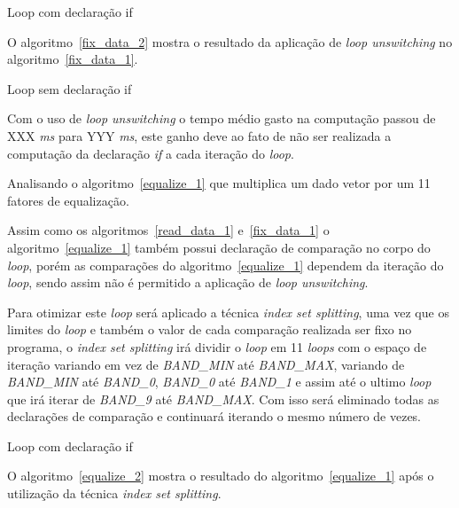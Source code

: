 \begin{algorithm}
    \caption{Loop com declaração if }
    \label{fix_data_1}

\end{algorithm}

O algoritmo~\ref{fix_data_2} mostra o resultado da aplicação de \textit{loop
unswitching} no algoritmo~\ref{fix_data_1}.

\begin{algorithm}
    \caption{Loop sem declaração if }
    \label{fix_data_2}

\end{algorithm}

Com o uso de \textit{loop unswitching} o tempo médio gasto na computação passou
de XXX \textit{ms} para YYY \textit{ms}, este ganho deve ao fato de não ser
realizada a computação da declaração \textit{if} a cada iteração do
\textit{loop}.


Analisando o algoritmo~\ref{equalize_1} que multiplica um dado vetor por um
11 fatores de equalização.

Assim como os algoritmos~\ref{read_data_1} e~\ref{fix_data_1} o
algoritmo~\ref{equalize_1} também possui declaração de comparação no corpo do
\textit{loop}, porém as comparações do algoritmo~\ref{equalize_1} dependem da
iteração do \textit{loop}, sendo assim não é permitido a aplicação de
\textit{loop unswitching}.

Para otimizar este \textit{loop} será aplicado a técnica \textit{index set
splitting}, uma vez que os limites do \textit{loop} e também o valor de cada
comparação realizada ser fixo no programa, o \textit{index set splitting} irá
dividir o \textit{loop} em 11 \textit{loops} com o espaço de iteração variando
em vez de \textit{BAND\_MIN} até \textit{BAND\_MAX}, variando de
\textit{BAND\_MIN} até \textit{BAND\_0}, \textit{BAND\_0} até \textit{BAND\_1} e
assim até o ultimo \textit{loop} que irá iterar de \textit{BAND\_9} até
\textit{BAND\_MAX}. Com isso será eliminado todas as declarações de comparação e
continuará iterando o mesmo número de vezes.

\begin{algorithm}
\caption{Loop com declaração if }
\label{equalize_1}

\end{algorithm}

O algoritmo~\ref{equalize_2} mostra o resultado do algoritmo~\ref{equalize_1}
após o utilização da técnica \textit{index set splitting}.

